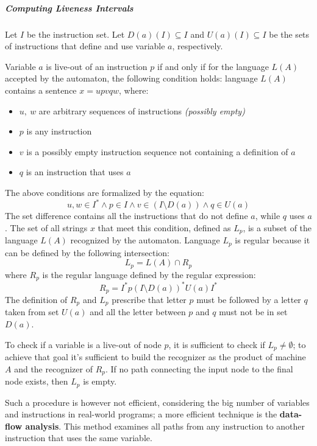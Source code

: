 \documentclass[english]{article}
\begin{document}
\subparagraph*{Computing Liveness Intervals}

Let \(I\) be the instruction set.
Let \(D(a)(I) \subseteq I\) and \(U(a)(I) \subseteq I\) be the sets of instructions that define and use variable \(a\), respectively.

Variable \(a\) is live-out of an instruction \(p\) if and only if for the language \(L(A)\) accepted by the automaton, the following condition holds:
language \(L(A)\) contains a sentence \(x = u p v q w\), where:
\begin{itemize}
  \item \(u, \ w\) are arbitrary sequences of instructions \textit{(possibly empty)}
  \item \(p\) is any instruction
  \item \(v\) is a possibly empty instruction sequence not containing a definition of \(a\)
  \item \(q\) is an instruction that uses \(a\)
\end{itemize}

The above conditions are formalized by the equation:
\[ u, w \in I^\ast \land p \in I \land v \in \left( I \setminus D\left( a \right) \right) \land q \in U\left( a \right) \]
The set difference contains all the instructions that do not define \(a\), while \(q\) uses \(a\).
The set of all strings \(x\) that meet this condition, defined as \(L_p\), is a subset of the language \(L(A)\) recognized by the automaton.
Language \(L_p\) is regular because it can be defined by the following intersection:
\[ L_p = L(A) \cap R_p \]
where \(R_p\) is the regular language defined by the regular expression:
\[ R_p = I^\ast p \left( I \setminus D \left( a \right) \right)^\ast U \left( a \right) I^\ast \]
The definition of \(R_p\) and \(L_p\) prescribe that letter \(p\) must be followed by a letter \(q\) taken from set \(U\left( a \right)\)  and all the letter between \(p\) and \(q\) must not be in set \(D\left( a \right)\).

To check if a variable is a live-out of node \(p\), it is sufficient to check if \(L_p \neq \emptyset\);
to achieve that goal it's sufficient to build the recognizer as the product of machine \(A\) and the recognizer of \(R_p\).
If no path connecting the input node to the final node exists, then \(L_p\) is empty.

Such a procedure is however not efficient, considering the big number of variables and instructions in real-world programs;
a more efficient technique is the \textbf{data-flow analysis}.
This method examines all paths from any instruction to another instruction that uses the same variable.
\end{document}
